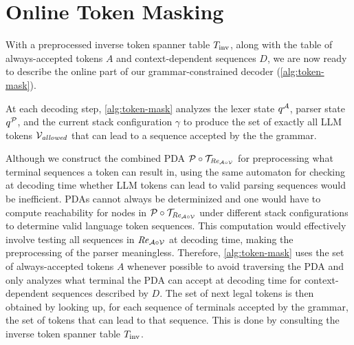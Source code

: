 \section{Online Token Masking}
\label{sec:online}

With a preprocessed inverse token spanner table $T_{\textrm{inv}}$, along with the table of always-accepted tokens $A$ and context-dependent sequences $D$, we are now ready to describe the online part of our grammar-constrained decoder (\autoref{alg:token-mask}).

At each decoding step, \autoref{alg:token-mask} analyzes the lexer state $q^{\mathcal{A}}$, parser state $q^{\mathcal{P}}$, and the current stack configuration $\gamma$ to produce the set of exactly all LLM tokens $\mathcal{V}_{\textit{allowed}}$ that  can lead to a sequence accepted by the the grammar.

% 
Although we construct the combined PDA $\mathcal{P} \circ \mathcal{T}_{\mathit{Re}_{\mathcal{A} \circ \mathcal{V}}}$ for preprocessing what terminal sequences a token can result in, using the same automaton for checking at decoding time whether LLM tokens can lead to valid parsing sequences would be inefficient. 
PDAs cannot always be determinized and one would have to compute reachability for nodes in 
$\mathcal{P} \circ \mathcal{T}_{\mathit{Re}_{\mathcal{A} \circ \mathcal{V}}}$ under different stack configurations to determine valid language token sequences. 
% 
This computation would effectively involve testing all sequences in $\mathit{Re}_{\mathcal{A} \circ \mathcal{V}}$ at decoding time, making the preprocessing of the parser meaningless.
% 
Therefore, \autoref{alg:token-mask} uses the set of always-accepted tokens $A$ whenever possible to avoid traversing the PDA and only analyzes what terminal the PDA can accept at decoding time for context-dependent sequences described by $D$.
The set of next legal tokens is then obtained by looking up, for each sequence of terminals accepted by the grammar, the set of tokens that can lead to that sequence. This is done by consulting the inverse token spanner table $T_{\textrm{inv}}$.

